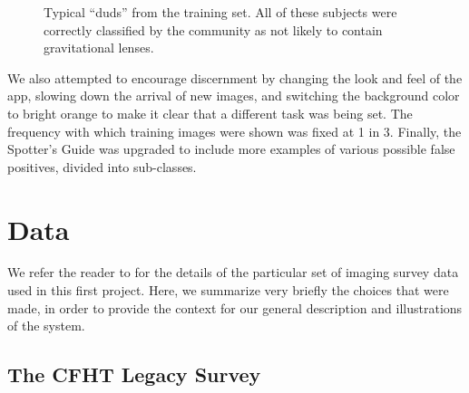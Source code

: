 \documentclass[useAMS,usenatbib,a4paper]{mn2e}
\begin{document}
\begin{figure}%
\begin{minipage}[b]{0.24\linewidth}
\centering{}
\end{minipage} \hfill
\begin{minipage}[b]{0.24\linewidth}
\centering{}
\end{minipage} \hfill
\begin{minipage}[b]{0.24\linewidth}
\centering{}
\end{minipage} \hfill
\begin{minipage}[b]{0.24\linewidth}
\centering{}
\end{minipage} \hfill
\caption{Typical \SW ``duds'' from the \StageTwo training set. All of these
subjects were correctly classified by the community as not likely to contain
gravitational lenses.} \label{fig:training-gallery:duds}
\end{figure}

We also attempted to encourage discernment by changing the look and feel of
the app, slowing down the arrival of new images, and switching the background
color to bright orange to make it clear that a different task was being set.
The frequency with which training images were shown was fixed at 1 in 3.
Finally, the Spotter's Guide was upgraded to include more examples
of various possible false positives, divided into sub-classes.



\section{Data}
\label{sec:data}

We refer the reader to \PaperTwo for the details of the particular set of
imaging survey data used in this first \SW project. Here, we summarize very
briefly the choices that were made, in order to provide the context for our
general description and illustrations of the \SW system.


\subsection{The CFHT Legacy Survey}
\label{sec:data:CFHTLS}
\end{document}
